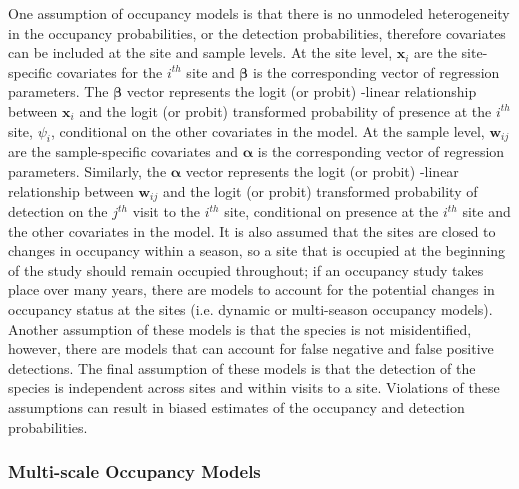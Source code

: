 \documentclass[12pt]{article}\usepackage[]{graphicx}\usepackage[]{color}
\begin{document}
One assumption of occupancy models is that there is no unmodeled heterogeneity in the occupancy probabilities, or the detection probabilities, therefore covariates can be included at the site and sample levels. At the site level, $\bm{x}_i$ are the site-specific covariates for the $i^{th}$ site and $\bm{\beta}$ is the corresponding vector of regression parameters. The $\bm\beta$ vector represents the logit (or probit) -linear relationship between $\bm{x}_i$ and the logit (or probit) transformed probability of presence at the $i^{th}$ site, $\psi_i$, conditional on the other covariates in the model. At the sample level, $\bm{w}_{ij}$ are the sample-specific covariates and $\bm{\alpha}$ is the corresponding vector of regression parameters. Similarly, the $\bm\alpha$ vector represents the logit (or probit) -linear relationship between $\bm{w}_{ij}$ and the logit (or probit) transformed probability of detection on the $j^{th}$ visit to the $i^{th}$ site, conditional on presence at the $i^{th}$ site and the other covariates in the model. It is also assumed that the sites are closed to changes in occupancy within a season, so a site that is occupied at the beginning of the study should remain occupied throughout; if an occupancy study takes place over many years, there are models to account for the potential changes in occupancy status at the sites (i.e. dynamic or multi-season occupancy models). Another assumption of these models is that the species is not misidentified, however, there are models that can account for false negative and false positive detections. The final assumption of these models is that the detection of the species is independent across sites and within visits to a site. Violations of these assumptions can result in biased estimates of the occupancy and detection probabilities. 

\subsubsection{Multi-scale Occupancy Models}
\end{document}
